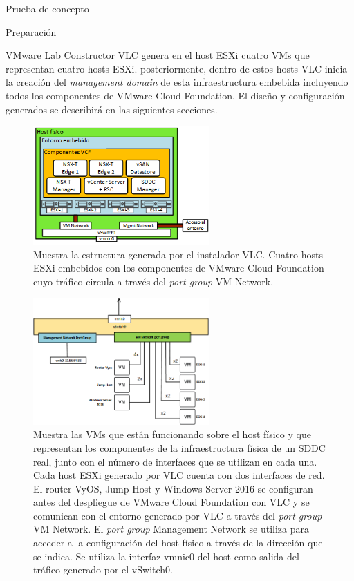\begin{section}{Prueba de concepto}
\begin{subsection}{Preparación}
  \begin{subsubsection}{VMware Lab Constructor}
    VLC genera en el host ESXi cuatro VMs que representan cuatro hosts ESXi. posteriormente, dentro de estos hosts VLC inicia la creación del \textit{management domain} de esta infraestructura embebida incluyendo todos los componentes de VMware Cloud Foundation. El diseño y configuración generados se describirá en las siguientes secciones.
    \begin{figure}[h!]
      \centering
      \includegraphics[width=0.6\textwidth]{imaxes/pruebaconcepto/hostFisico.png}
      \caption{Muestra la estructura generada por el instalador VLC. Cuatro hosts ESXi embebidos con los componentes de VMware Cloud Foundation cuyo tráfico circula a través del \textit{port group} VM Network.}
      \label{fig:estructura-generada-por-VLC}
    \end{figure}
    \begin{figure}[h]
      \centering
      \includegraphics[width=0.6\textwidth]{imaxes/pruebaconcepto/vSwitch0HostFisico.png}
      \caption{Muestra las VMs que están funcionando sobre el host físico y que representan los componentes de la infraestructura física de un SDDC real, junto con el número de interfaces que se utilizan en cada una. Cada host ESXi generado por VLC cuenta con dos interfaces de red. El router VyOS, Jump Host y Windows Server 2016 se configuran antes del despliegue de VMware Cloud Foundation con VLC y se comunican con el entorno generado por VLC a través del \textit{port group} VM Network. El \textit{port group} Management Network se utiliza para acceder a la configuración del host físico a través de la dirección que se indica. Se utiliza la interfaz vmnic0 del host como salida del tráfico generado por el vSwitch0.}

\end{figure}
\end{subsubsection}
\end{subsection}
\end{section}
